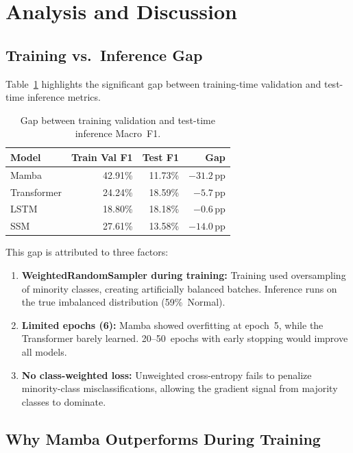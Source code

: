 \documentclass[runningheads]{llncs}
\begin{document}
\section{Analysis and Discussion}
\label{sec:analysis}

\subsection{Training vs.\ Inference Gap}

Table~\ref{tab:gap} highlights the significant gap between training-time
validation and test-time inference metrics.

\begin{table}[ht]
\centering
\caption{Gap between training validation and test-time inference Macro~F1.}
\label{tab:gap}
\begin{tabular}{@{} l r r r @{}}
\toprule
\textbf{Model} & \textbf{Train Val F1} & \textbf{Test F1} & \textbf{Gap} \\
\midrule
Mamba       & 42.91\% & 11.73\% & $-31.2$\,pp \\
Transformer & 24.24\% & 18.59\% & $-5.7$\,pp  \\
LSTM        & 18.80\% & 18.18\% & $-0.6$\,pp  \\
SSM         & 27.61\% & 13.58\% & $-14.0$\,pp \\
\bottomrule
\end{tabular}
\end{table}

This gap is attributed to three factors:
\begin{enumerate}
    \item \textbf{WeightedRandomSampler during training:} Training used
          oversampling of minority classes, creating artificially balanced
          batches. Inference runs on the true imbalanced distribution
          (59\%~Normal).
    \item \textbf{Limited epochs (6):} Mamba showed overfitting at epoch~5,
          while the Transformer barely learned. 20--50~epochs with early
          stopping would improve all models.
    \item \textbf{No class-weighted loss:} Unweighted cross-entropy fails to
          penalize minority-class misclassifications, allowing the gradient
          signal from majority classes to dominate.
\end{enumerate}


\subsection{Why Mamba Outperforms During Training}
\end{document}
